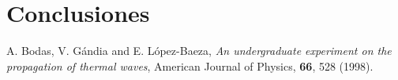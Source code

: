 \documentclass[twoside,twocolumn,a4paper]{article}
\begin{document}

\section{Conclusiones}


\newpage
\begin{thebibliography}{99} %


 A. Bodas, V. G\'andia and E. L\'opez-Baeza, \textit{An undergraduate experiment on the propagation of thermal waves}, American Journal of Physics, \textbf{66}, 528 (1998). 
 
\end{thebibliography}


\end{document}
